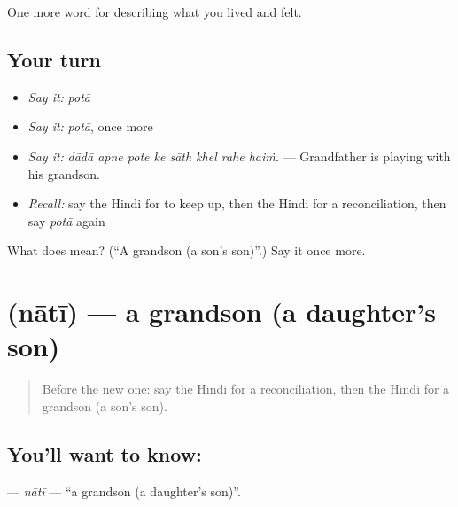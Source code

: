 \begin{grammarlens}[title={What you've built}]
One more word for describing what you lived and felt.
\end{grammarlens}

\subsection*{Your turn}
\begin{itemize}
\raggedright
  \item \emph{Say it:} \emph{potā}
  \item \emph{Say it:} \emph{potā}, once more
  \item \emph{Say it:} \emph{dādā apne pote ke sāth khel rahe haiṁ.} — Grandfather is playing with his grandson.
  \item \emph{Recall:} say the Hindi for to keep up, then the Hindi for a reconciliation, then say \emph{potā} again
\end{itemize}

\begin{tcolorbox}[breakable,colback=teal!4,colframe=teal!35!black,title={Before you move on}]
What does  mean? (\textquotedblleft{}A grandson (a son's son)\textquotedblright{}.) Say it once more.
\end{tcolorbox}
\section[\texorpdfstring{\hi{नाती} (nātī)}{नाती (nātī)}]{ (nātī) — a grandson (a daughter's son)}

\label{lesson:HI-C502-nati}



\begin{quote}
Before the new one: say the Hindi for a reconciliation, then the Hindi for a grandson (a son's son).
\end{quote}

\subsection*{You'll want to know: }
\textbf{} — \emph{nātī} — \textquotedblleft{}a grandson (a daughter's son)\textquotedblright{}.

\begin{quote}
       
\end{quote}

